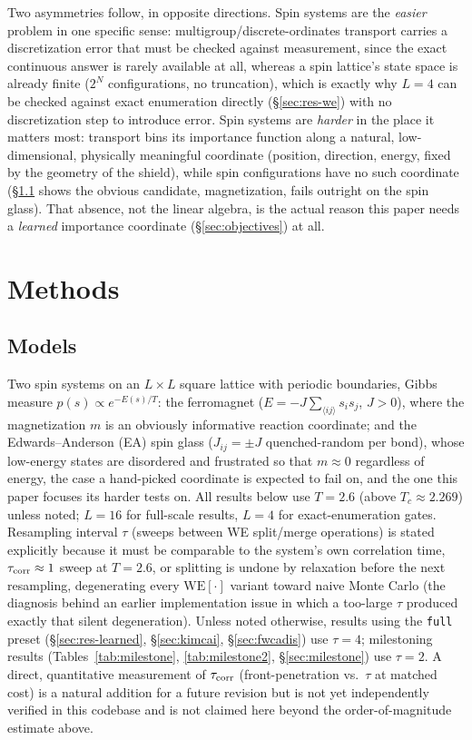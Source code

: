 \documentclass[11pt]{article}
\begin{document}
	Two asymmetries follow, in opposite directions. Spin systems are the \emph{easier} problem
	in one specific sense: multigroup/discrete-ordinates transport carries a discretization
	error that must be checked against measurement, since the exact continuous answer is rarely
	available at all, whereas a spin lattice's state space is already finite
	($2^N$ configurations, no truncation), which is exactly why $L=4$ can be checked against
	exact enumeration directly (\S\ref{sec:res-we}) with no discretization step to introduce
	error. Spin systems are \emph{harder} in the place it matters most: transport bins its
	importance function along a natural, low-dimensional, physically meaningful coordinate
	(position, direction, energy, fixed by the geometry of the shield), while spin
	configurations have no such coordinate (\S\ref{sec:models} shows the obvious candidate,
	magnetization, fails outright on the spin glass). That absence, not the linear algebra, is
	the actual reason this paper needs a \emph{learned} importance coordinate
	(\S\ref{sec:objectives}) at all.

	\section{Methods}
	\label{sec:methods}
	
	\subsection{Models}
	\label{sec:models}
	Two spin systems on an $L\times L$ square lattice with periodic boundaries, Gibbs measure
	$p(s)\propto e^{-E(s)/T}$: the ferromagnet ($E=-J\sum_{\langle ij\rangle}s_is_j$,
	$J>0$), where the magnetization $m$ is an obviously informative reaction coordinate; and
	the Edwards--Anderson (EA) spin glass ($J_{ij}=\pm J$ quenched-random per bond),
	whose low-energy states are disordered and frustrated so that $m\approx 0$ regardless of
	energy, the case a hand-picked coordinate is expected to fail on, and the one this paper
	focuses its harder tests on. All results below use $T=2.6$ (above $T_c\approx2.269$) unless
	noted; $L=16$ for full-scale results, $L=4$ for exact-enumeration gates. Resampling
		interval $\tau$ (sweeps between WE split/merge operations) is stated explicitly because it
	must be comparable to the system's own correlation time, $\tau_{\rm corr}\approx1$ sweep at
	$T=2.6$, or splitting is undone by relaxation before the next resampling, degenerating every
	$\mathrm{WE}[\cdot]$ variant toward naive Monte Carlo (the diagnosis behind an earlier
	implementation issue in which a too-large $\tau$ produced exactly that silent degeneration).
	Unless noted otherwise, results using the \texttt{full} preset (\S\ref{sec:res-learned},
	\S\ref{sec:kimcai}, \S\ref{sec:fwcadis}) use $\tau=4$; milestoning results
	(Tables~\ref{tab:milestone}, \ref{tab:milestone2}, \S\ref{sec:milestone}) use $\tau=2$. A
	direct, quantitative measurement of $\tau_{\rm corr}$ (front-penetration vs.\ $\tau$ at
	matched cost) is a natural addition for a future revision but is not yet independently
	verified in this codebase and is not claimed here beyond the order-of-magnitude estimate
	above.
\end{document}
